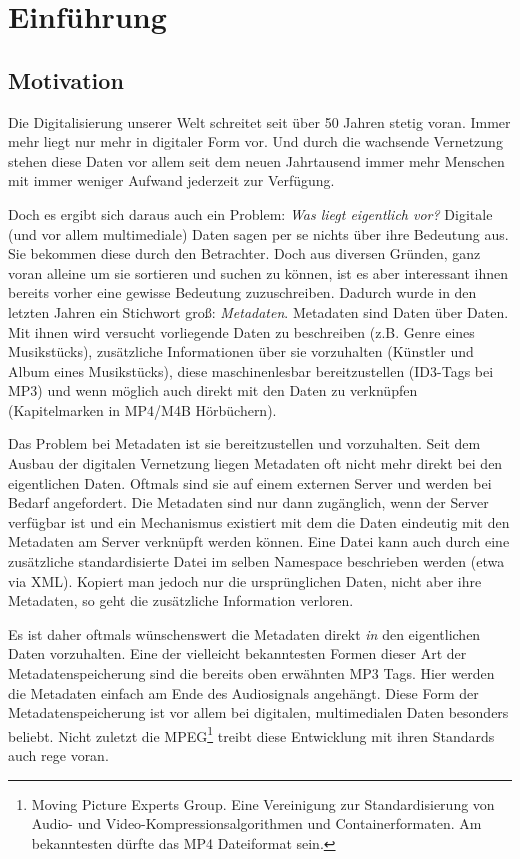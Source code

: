 \chapter{Einf\"uhrung}
\label{ch:intro}

\section{Motivation}

Die Digitalisierung unserer Welt schreitet seit \"uber 50 Jahren stetig voran. Immer mehr liegt nur mehr in digitaler Form vor. Und durch die wachsende Vernetzung stehen diese Daten vor allem seit dem neuen Jahrtausend immer mehr Menschen mit immer weniger Aufwand jederzeit zur Verf\"ugung. 

Doch es ergibt sich daraus auch ein Problem: \textit{Was liegt eigentlich vor?} Digitale (und vor allem multimediale) Daten sagen per se nichts \"uber ihre Bedeutung aus. Sie bekommen diese durch den Betrachter. Doch aus diversen Gr\"unden, ganz voran alleine um sie sortieren und suchen zu k\"onnen, ist es aber interessant ihnen bereits vorher eine gewisse Bedeutung zuzuschreiben. Dadurch wurde in den letzten Jahren ein Stichwort groß: \textit{Metadaten}. Metadaten sind \glqq{}Daten \"uber Daten\grqq{}. Mit ihnen wird versucht vorliegende Daten zu beschreiben (z.B. Genre eines Musikst\"ucks), zus\"atzliche Informationen \"uber sie vorzuhalten (K\"unstler und Album eines Musikst\"ucks), diese maschinenlesbar bereitzustellen (ID3-Tags bei MP3) und wenn m\"oglich auch direkt mit den Daten zu verkn\"upfen (Kapitelmarken in MP4/M4B H\"orb\"uchern).

Das Problem bei Metadaten ist sie bereitzustellen und vorzuhalten. Seit dem Ausbau der digitalen Vernetzung liegen Metadaten oft nicht mehr direkt bei den eigentlichen Daten. Oftmals sind sie auf einem externen Server und werden bei Bedarf angefordert. Die Metadaten sind nur dann zug\"anglich, wenn der Server verf\"ugbar ist und ein Mechanismus existiert mit dem die Daten eindeutig mit den Metadaten am Server verkn\"upft werden k\"onnen. 
Eine Datei kann auch durch eine zus\"atzliche standardisierte Datei im selben Namespace beschrieben werden (etwa via XML). Kopiert man jedoch nur die urspr\"unglichen Daten, nicht aber ihre Metadaten, so geht die zus\"atzliche Information verloren. 

Es ist daher oftmals w\"unschenswert die Metadaten direkt \textit{in} den eigentlichen Daten vorzuhalten. Eine der vielleicht bekanntesten Formen dieser Art der Metadatenspeicherung sind die bereits oben erw\"ahnten MP3 Tags. Hier werden die Metadaten einfach am Ende des Audiosignals angeh\"angt. Diese Form der Metadatenspeicherung ist vor allem bei digitalen, multimedialen Daten besonders beliebt. Nicht zuletzt die MPEG\footnote{Moving Picture Experts Group. Eine Vereinigung zur Standardisierung von Audio- und Video-Kompressionsalgorithmen und Containerformaten. Am bekanntesten d\"urfte das MP4 Dateiformat sein.} treibt diese Entwicklung mit ihren Standards auch rege voran. 

